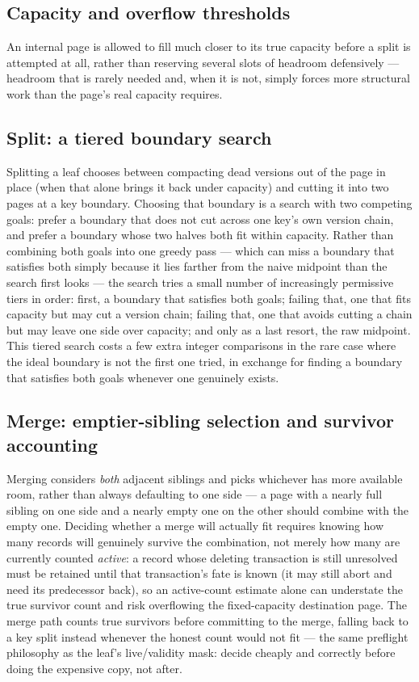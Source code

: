 \documentclass[11pt]{article}
\begin{document}
\subsection{Capacity and overflow thresholds}

An internal page is allowed to fill much closer to its true capacity before a
split is attempted at all, rather than reserving several slots of headroom
defensively --- headroom that is rarely needed and, when it is not, simply forces
more structural work than the page's real capacity requires.

\subsection{Split: a tiered boundary search}

Splitting a leaf chooses between compacting dead versions out of the page in place
(when that alone brings it back under capacity) and cutting it into two pages at a
key boundary. Choosing that boundary is a search with two competing goals: prefer a
boundary that does not cut across one key's own version chain, and prefer a
boundary whose two halves both fit within capacity. Rather than combining both goals
into one greedy pass --- which can miss a boundary that satisfies both simply
because it lies farther from the naive midpoint than the search first looks ---
the search tries a small number of increasingly permissive tiers in order: first, a
boundary that satisfies both goals; failing that, one that fits capacity but may cut
a version chain; failing that, one that avoids cutting a chain but may leave one side
over capacity; and only as a last resort, the raw midpoint. This tiered search costs
a few extra integer comparisons in the rare case where the ideal boundary is not the
first one tried, in exchange for finding a boundary that satisfies both goals
whenever one genuinely exists.

\subsection{Merge: emptier-sibling selection and survivor accounting}

Merging considers \emph{both} adjacent siblings and picks whichever has more
available room, rather than always defaulting to one side --- a page with a nearly
full sibling on one side and a nearly empty one on the other should combine with the
empty one. Deciding whether a merge will actually fit requires knowing how many
records will genuinely survive the combination, not merely how many are currently
counted \emph{active}: a record whose deleting transaction is still unresolved must
be retained until that transaction's fate is known (it may still abort and need its
predecessor back), so an active-count estimate alone can understate the true
survivor count and risk overflowing the fixed-capacity destination page. The merge
path counts true survivors before committing to the merge, falling back to a key
split instead whenever the honest count would not fit --- the same preflight
philosophy as the leaf's live/validity mask: decide cheaply and correctly before
doing the expensive copy, not after.
\end{document}
